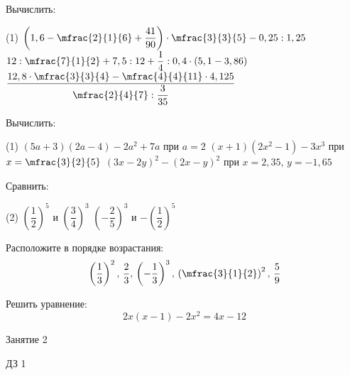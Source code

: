 %

\begin{class}[number=1]
	\begin{listofex}
		\item Вычислить:
		\begin{tasks}(1)
			\task \( \left( 1,6-\mfrac{2}{1}{6}+\dfrac{41}{90} \right)\cdot\mfrac{3}{3}{5}-0,25:1,25 \)
			\task \( 12:\mfrac{7}{1}{2}+7,5:12+\dfrac{1}{4}:0,4\cdot(5,1-3,86) \)
			\task \( \dfrac{12,8\cdot\mfrac{3}{3}{4}-\mfrac{4}{4}{11}\cdot4,125}{\mfrac{2}{4}{7}:\dfrac{3}{35}} \)
		\end{tasks}
		\item Вычислить:
		\begin{tasks}(1)
			\task \( (5a+3)(2a-4)-2a^2+7a \) при \( a=2 \)
			\task \( (x+1)(2x^2-1)-3x^3 \) при \( x=\mfrac{3}{2}{5} \)
			\task \( (3x-2y)^2-(2x-y)^2 \) при \( x=2,35,\,y=-1,65 \)
		\end{tasks}
		\item Сравнить:
		\begin{tasks}(2)
			\task \( \left( \dfrac{1}{2} \right)^5 \) и \( \left( \dfrac{3}{4} \right)^3 \)
			\task \( \left( -\dfrac{2}{5} \right)^3 \) и \( -\left( \dfrac{1}{2} \right)^5 \)
		\end{tasks}
		\item Расположите в порядке возрастания:
		\[ \left( \dfrac{1}{3} \right)^2,\,\dfrac{2}{3},\,\left( -\dfrac{1}{3} \right)^3,\,\left( \mfrac{3}{1}{2} \right)^2,\,\dfrac{5}{9} \]
		\item Решить уравнение:
		\[ 2x(x-1)-2x^2=4x-12 \]
	\end{listofex}
\end{class}

\begin{class}[number=2]
	\begin{listofex}
		\item Занятие 2
	\end{listofex}
\end{class}

\begin{homework}[number=1]
	\begin{listofex}
		\item   ДЗ 1
	\end{listofex}
\end{homework}

